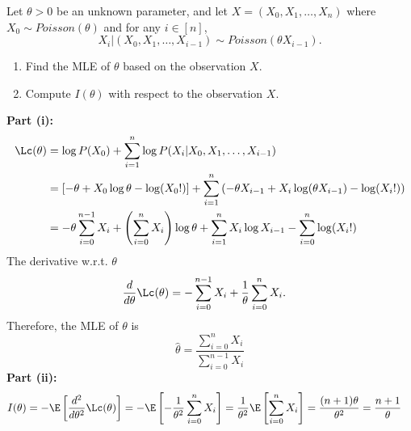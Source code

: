 \documentclass{article}
\begin{document}
\MakeAssignmentTitle

\begin{homeworkProblem}
  Let $\theta > 0$ be an unknown parameter, and let $X = (X_0, X_1, \ldots, X_n)$ where
  $X_0 \sim Poisson(\theta)$ and for any $i \in [n]$,
  \[
    X_i | (X_0, X_1, \ldots, X_{i-1}) \sim Poisson (\theta X_{i-1}).
  \]
  \begin{enumerate}[label=(\roman*), topsep=5pt, itemsep=5pt]
    \item Find the MLE of $\theta$ based on the observation $X$.
    \item Compute $I(\theta)$ with respect to the observation $X$. \newline
  \end{enumerate}

  \solution

  \textbf{Part (i):}
  \begin{align*}
    \Lc (\theta) & = \log P(X_0) + \sum_{i=1}^n \log P(X_i | X_0, X_1, \ldots, X_{i-1})                                                                             \\
                 & = \left[-\theta + X_0 \log \theta - \log (X_0 !)\right] + \sum_{i=1}^n \left( -\theta X_{i-1} + X_i \log (\theta X_{i-1}) - \log (X_i !) \right) \\
                 & = -\theta \sum_{i=0}^{n-1} X_i + \left( \sum_{i=0}^n X_i \right) \log \theta + \sum_{i=1}^n X_i \log X_{i-1} - \sum_{i=0}^n \log (X_i !)
  \end{align*}
  The derivative w.r.t. $\theta$
  \begin{align*}
    \frac{d}{d\theta} \Lc (\theta) & = -\sum_{i=0}^{n-1} X_i + \frac{1}{\theta} \sum_{i=0}^n X_i.
  \end{align*}
  Therefore, the MLE of $\theta$ is
  \[
    \hat{\theta} = \frac{\sum_{i=0}^n X_i}{\sum_{i=0}^{n-1} X_i}
  \]
  \textbf{Part (ii):}
  \begin{align*}
    I(\theta) & = -\E \left[ \frac{d^2}{d\theta^2} \Lc (\theta) \right] = -\E \left[ -\frac{1}{\theta^2} \sum_{i=0}^n X_i \right] = \frac{1}{\theta^2} \E \left[ \sum_{i=0}^n X_i \right] = \frac{(n+1)\theta}{\theta^2} = \frac{n+1}{\theta}
  \end{align*}


\end{homeworkProblem}

\pagebreak
\end{document}
